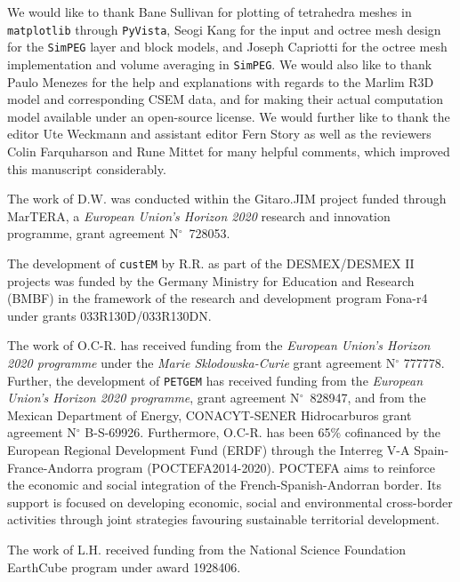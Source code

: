 \documentclass[extra, camera,%
]{gji}
\newcommand{\simpeg}{\texttt{SimPEG}\xspace}
\newcommand{\custem}{\texttt{custEM}\xspace}
\newcommand{\petgem}{\texttt{PETGEM}\xspace}
\begin{document}
\begin{acknowledgments}

We would like to thank Bane Sullivan for plotting of tetrahedra meshes in \texttt{matplotlib} through \texttt{PyVista}, Seogi Kang for the input and octree mesh design for the \simpeg layer and block models, and Joseph Capriotti for the octree mesh implementation and volume averaging in \simpeg. We would also like to thank Paulo Menezes for the help and explanations with regards to the Marlim R3D model and corresponding CSEM data, and for making their actual computation model available under an open-source license. We would further like to thank the editor Ute Weckmann and assistant editor Fern Story as well as the reviewers Colin Farquharson and Rune Mittet for many helpful comments, which improved this manuscript considerably.

The work of D.W. was conducted within the Gitaro.JIM project funded through MarTERA, a \emph{European Union's Horizon 2020} research and innovation programme, grant agreement N$^\circ$~728053.

The development of \custem by R.R. as part of the DESMEX/DESMEX II projects was funded by the Germany Ministry for Education and Research (BMBF) in the framework of the research and development program Fona-r4 under grants 033R130D/033R130DN.

The work of O.C-R. has received funding from the \emph{European Union's Horizon 2020 programme} under the \emph{Marie Sklodowska-Curie} grant agreement N$^\circ$ 777778. Further, the development of \petgem has received funding from the \emph{European Union's Horizon 2020 programme}, grant agreement N$^\circ$~828947, and from the Mexican Department of Energy, CONACYT-SENER Hidrocarburos grant agreement N$^\circ$ B-S-69926. Furthermore, O.C-R. has been 65\% cofinanced by the European Regional Development Fund (ERDF) through the Interreg V-A Spain-France-Andorra program (POCTEFA2014-2020). POCTEFA aims to reinforce the economic and social integration of the French-Spanish-Andorran border. Its support is focused on developing economic, social and environmental cross-border activities through joint strategies favouring sustainable territorial development.

The work of L.H. received funding from the National Science Foundation EarthCube program under award 1928406.
\end{acknowledgments}




\label{lastpage}
\end{document}
